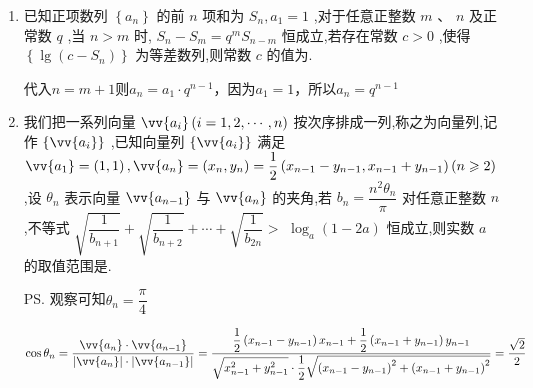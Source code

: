 \begin{enumerate}
\begin{jieda}
\begin{dingautolist}{172}
            当$n = 1$时，根据零点存在定理可知$f(x)$在$(1, 2)$内存在零点，满足要求.
        \end{dingautolist}
    \end{jieda}
    \item 已知正项数列 $\left\{  {a}_{n}\right\}$ 的前 $n$ 项和为 ${S}_{n},{a}_{1} = 1$ ,对于任意正整数 $m\text{ 、 }n$ 及正常数 $q$ ,当 $n > m$ 时, ${S}_{n} - {S}_{m} = {q}^{m}{S}_{n - m}$ 恒成立,若存在常数 $c > 0$ ,使得 $\left\{  {\lg \left( {c - {S}_{n}}\right) }\right\}$ 为等差数列,则常数 $c$ 的值为.
    \begin{jieda}
        代入$n = m+1$则$a_n = a_1 \cdot q^{n-1}$，因为$a_1 = 1$，所以$a_n = q^{n-1}$
    \end{jieda}
    \item 我们把一系列向量 $\vv{{a}_{i}}\left( {i = 1,2,\cdots ,n}\right)$ 按次序排成一列,称之为向量列,记作 $\left\{  \vv{{a}_{i}}\right\}$ ,已知向量列 $\left\{  \vv{{a}_{i}}\right\}$ 满足 $\vv{{a}_{1}} = \left( {1,1}\right) ,\vv{{a}_{n}} = \left( {{x}_{n},{y}_{n}}\right)  = \dfrac{1}{2}\left( {{x}_{n - 1} - {y}_{n - 1},{x}_{n - 1} + {y}_{n - 1}}\right) \left( {n \geq  2}\right)$ ,设 ${\theta }_{n}$ 表示向量 $\vv{{a}_{n - 1}}$ 与 $\vv{{a}_{n}}$ 的夹角,若 ${b}_{n} = \dfrac{{n}^{2}{\theta }_{n}}{\pi }$ 对任意正整数 $n$ ,不等式 $\sqrt{\dfrac{1}{{b}_{n + 1}}} + \sqrt{\dfrac{1}{{b}_{n + 2}}} + \cdots  + \sqrt{\dfrac{1}{{b}_{2n}}} >$  ${\log }_{a}\left( {1 - {2a}}\right)$ 恒成立,则实数 $a$ 的取值范围是.
    \begin{jieda}
        \ps 观察可知$\theta_n = \dfrac{\pi}{4}$

        $\cos {\theta }_{n} = \dfrac{\vv{{a}_{n}} \cdot  \vv{{a}_{n - 1}}}{\left| \vv{{a}_{n}}\right|  \cdot  \left| \vv{{a}_{n - 1}}\right| } = \dfrac{\dfrac{1}{2}\left( {{x}_{n - 1} - {y}_{n - 1}}\right) {x}_{n - 1} + \dfrac{1}{2}\left( {{x}_{n - 1} + {y}_{n - 1}}\right) {y}_{n - 1}}{\sqrt{{x}_{n - 1}^{2} + {y}_{n - 1}^{2}} \cdot  \dfrac{1}{2}\sqrt{{\left( {x}_{n - 1} - {y}_{n - 1}\right) }^{2} + {\left( {x}_{n - 1} + {y}_{n - 1}\right) }^{2}}} = \dfrac{\sqrt{2}}{2}$
        

\end{jieda}
\end{enumerate}

